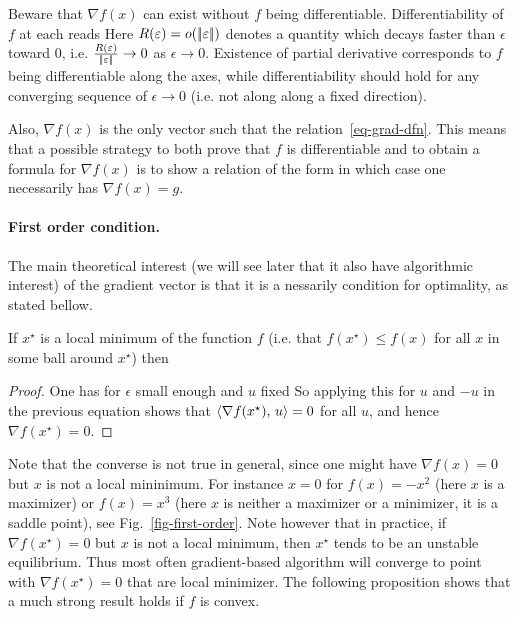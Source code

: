 Beware that $\nabla f(x)$ can exist without $f$ being differentiable. Differentiability of $f$ at each reads
%
Here $R(\varepsilon) = o(|\!| \varepsilon |\!|)$ denotes a quantity which decays faster than $\epsilon$ toward $0$, i.e. $\frac{R(\varepsilon)}{|\!| \varepsilon |\!|} \rightarrow 0$ as $\epsilon \rightarrow 0$. Existence of partial derivative corresponds to $f$ being differentiable along the axes, while differentiability should hold for any converging sequence of $\epsilon\rightarrow 0$ (i.e. not along along a fixed direction). 

Also, $\nabla f(x)$ is the only vector such that the relation~\eqref{eq-grad-dfn}. This means that a possible strategy to both prove that $f$ is differentiable and to obtain a formula for $\nabla f(x)$ is to show a relation of the form 
in which case one necessarily has $\nabla f(x)=g$. 


\paragraph{First order condition.}

The main theoretical interest (we will see later that it also have algorithmic interest) of the gradient vector is that it is a nessarily condition for optimality, as stated bellow. 

\begin{prop} 
If $x^\star$ is a local minimum of the function $f$ (i.e. that $f(x^\star) \leq f(x)$ for all $x$ in some ball around $x^\star$) then 
\end{prop}
\begin{proof}
One has for $\epsilon$ small enough and $u$ fixed 
So applying this for $u$ and $-u$ in the previous equation shows that $\langle \nabla f(x^\star),\,u\rangle=0$ for all $u$, and hence $\nabla f(x^\star)=0$.
\end{proof}

Note that the converse is not true in general, since one might have $\nabla f(x)=0$ but $x$ is not a local mininimum. For instance $x=0$ for $f(x)=-x^2$ (here $x$ is a maximizer) or $f(x)=x^3$ (here $x$ is neither a maximizer or a minimizer, it is a saddle point), see Fig.~\ref{fig-first-order}. 
%
Note however that in practice, if $\nabla f(x^\star) = 0$ but $x$ is not a local minimum, then $x^\star$ tends to be an unstable equilibrium. Thus most often gradient-based algorithm will converge to point with $\nabla f(x^\star) = 0$ that are local minimizer.
%
The following proposition shows that a much strong result holds if $f$ is convex.

